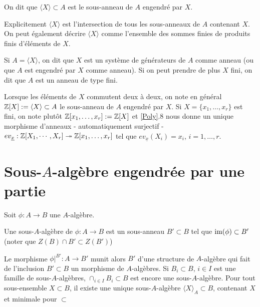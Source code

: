 \begin{definition}
    On dit que $\langle X\rangle\subset A$ est le sous-anneau de $A$ engendré
    par $X$.
\end{definition}

Explicitement $\langle X\rangle$ est l'intersection de tous les sous-anneaux de
$A$ contenant $X$. On peut également décrire $\langle X\rangle$ comme
l'ensemble des sommes finies de produits finis d'éléments de $X$.

\begin{definition}
    Si $A=\langle X\rangle$, on dit que $X$ est un système de générateurs de
    $A$ comme anneau (ou que $A$ est engendré par $X$ comme anneau). Si on peut
    prendre de plus $X$ fini, on dit que $A$ est un anneau de type fini.
\end{definition}

\begin{definition}
    Lorsque les éléments de $X$ commutent deux à deux, on note en général
    $\mathbb{Z}[X]:=\langle X\rangle \subset A$ le sous-anneau de $A$ engendré par $X$.
    Si  $X=\lbrace x_1,\dots,x_r\rbrace $ est fini, on note plutôt
    $\mathbb{Z}[x_1,\dots,x_r]:=\mathbb{Z}[X]$ et \ref{Poly}.8  nous donne un unique morphisme
    d'anneaux - automatiquement  surjectif - $ev_{\underline{x}}:\mathbb{Z}[X_1,\cdots,
    X_r]\twoheadrightarrow \mathbb{Z}[x_1,\dots,x_r] $ tel que
    $ev_{\underline{x}}(X_i)=x_i$, $i=1,\dots, r$.
\end{definition}

\section{Sous-$A$-algèbre engendrée par une partie}\label{SousAlg}

Soit $\phi:A\rightarrow B$ une $A$-algèbre.

\begin{definition}
    Une sous-$A$-algèbre de $\phi:A\rightarrow B$ est un sous-anneau $B'\subset
    B$ tel que $\operatorname{im}(\phi)\subset B'$ (noter que $Z(B)\cap B'\subset Z(B')$)
\end{definition}

Le morphisme $\phi|^{B'}:A\rightarrow B'$ munit alors $B'$ d'une structure de
$A$-algèbre qui fait de l'inclusion $B'\subset B$ un morphisme de $A$-algèbres.
Si    $B_i\subset B$, $i\in I$ est une famille de sous-$A$-algèbres,
$\cap_{i\in I}B_i\subset B$  est encore une sous-$A$-algèbre. Pour tout
sous-ensemble $X\subset B$, il existe une unique sous-$A$-algèbre $\langle
X\rangle_A \subset B$, contenant $X$ et minimale pour $\subset$

